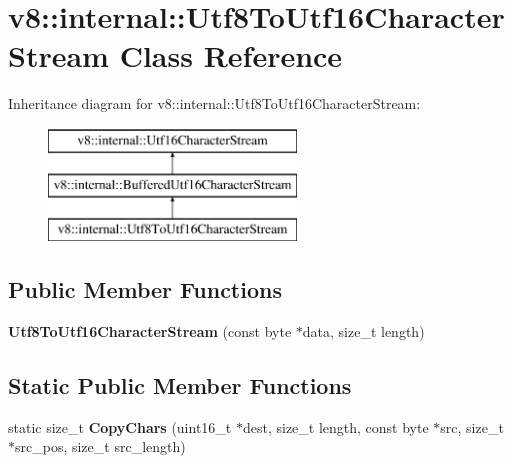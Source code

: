 \hypertarget{classv8_1_1internal_1_1_utf8_to_utf16_character_stream}{}\section{v8\+:\+:internal\+:\+:Utf8\+To\+Utf16\+Character\+Stream Class Reference}
\label{classv8_1_1internal_1_1_utf8_to_utf16_character_stream}
Inheritance diagram for v8\+:\+:internal\+:\+:Utf8\+To\+Utf16\+Character\+Stream\+:\begin{figure}[H]
\begin{center}
\leavevmode
\includegraphics[height=3.000000cm]{classv8_1_1internal_1_1_utf8_to_utf16_character_stream}
\end{center}
\end{figure}
\subsection*{Public Member Functions}
\begin{DoxyCompactItemize}
\item 
{\bfseries Utf8\+To\+Utf16\+Character\+Stream} (const byte $\ast$data, size\+\_\+t length)\hypertarget{classv8_1_1internal_1_1_utf8_to_utf16_character_stream_a33948214a9b0808d41503325b18e4352}{}\label{classv8_1_1internal_1_1_utf8_to_utf16_character_stream_a33948214a9b0808d41503325b18e4352}

\end{DoxyCompactItemize}
\subsection*{Static Public Member Functions}
\begin{DoxyCompactItemize}
\item 
static size\+\_\+t {\bfseries Copy\+Chars} (uint16\+\_\+t $\ast$dest, size\+\_\+t length, const byte $\ast$src, size\+\_\+t $\ast$src\+\_\+pos, size\+\_\+t src\+\_\+length)\hypertarget{classv8_1_1internal_1_1_utf8_to_utf16_character_stream_ae4ef0603d98144ac547b2aa9e26daf1d}{}\label{classv8_1_1internal_1_1_utf8_to_utf16_character_stream_ae4ef0603d98144ac547b2aa9e26daf1d}

\end{DoxyCompactItemize}
